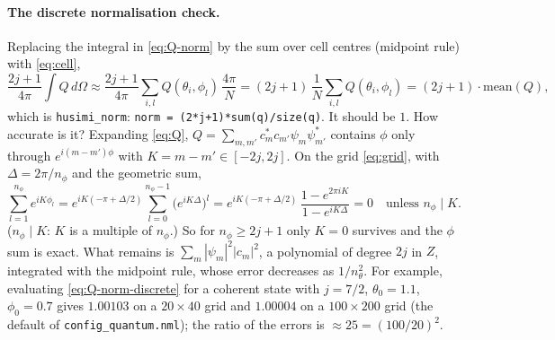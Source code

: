 \documentclass[11pt,a4paper]{article}
\begin{document}
\paragraph{The discrete normalisation check.} Replacing the integral in \eqref{eq:Q-norm} by the sum over cell centres
(midpoint rule) with \eqref{eq:cell},
\begin{equation}\label{eq:Q-norm-discrete}
  \frac{2j+1}{4\pi}\int Q\,d\Omega \approx \frac{2j+1}{4\pi}\sum_{i,l}Q(\theta_i,\phi_l)\,\frac{4\pi}{N}
  = (2j+1)\,\frac1N\sum_{i,l}Q(\theta_i,\phi_l) = (2j+1)\cdot\mathrm{mean}(Q) ,
\end{equation}
which is \texttt{husimi\_norm}: \lstinline!norm = (2*j+1)*sum(q)/size(q)!. It should be $1$. How accurate is it?
Expanding \eqref{eq:Q}, $Q = \sum_{m,m'}c_m^*c_{m'}\psi_m\psi_{m'}^*$ contains $\phi$ only through $e^{i(m-m')\phi}$ with
$K = m-m'\in[-2j,2j]$. On the grid \eqref{eq:grid}, with $\Delta = 2\pi/n_\phi$ and the geometric sum,
\begin{equation*}
  \sum_{l=1}^{n_\phi}e^{iK\phi_l} = e^{iK(-\pi+\Delta/2)}\sum_{l=0}^{n_\phi-1}\big(e^{iK\Delta}\big)^l
  = e^{iK(-\pi+\Delta/2)}\,\frac{1-e^{2\pi iK}}{1-e^{iK\Delta}} = 0
  \quad\text{unless } n_\phi \mid K .
\end{equation*}
($n_\phi\mid K$: $K$ is a multiple of $n_\phi$.)
So for $n_\phi\ge2j+1$ only $K = 0$ survives and the $\phi$ sum is exact. What remains is $\sum_m|\psi_m|^2|c_m|^2$,
a polynomial of degree $2j$ in $Z$, integrated with the midpoint rule, whose error decreases as $1/n_\theta^2$. For
example, evaluating \eqref{eq:Q-norm-discrete} for a coherent state with $j = 7/2$, $\theta_0 = 1.1$, $\phi_0 = 0.7$
gives $1.00103$ on a $20\times40$ grid and $1.00004$ on a $100\times200$ grid (the default of
\texttt{config\_quantum.nml}); the ratio of the errors is $\approx 25 = (100/20)^2$.
\end{document}
